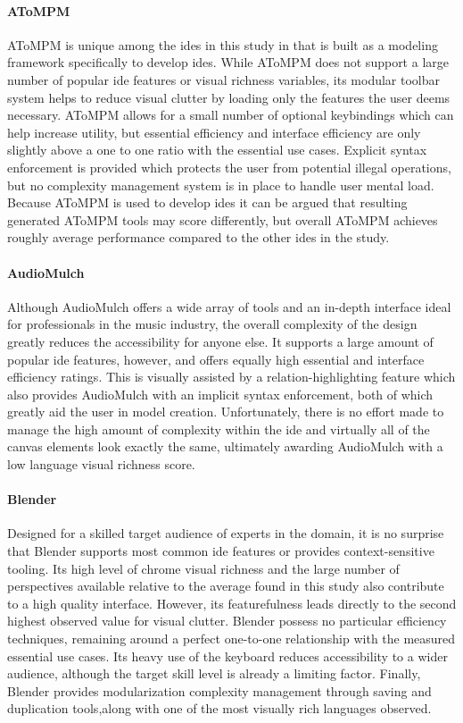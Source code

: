 \paragraph{AToMPM} AToMPM is unique among the \acp{ide} in this study in
that is built as a modeling framework specifically to develop \acp{ide}.
While AToMPM does not support a large number of popular \ac{ide} features
or visual richness variables, its modular toolbar system helps to reduce
visual clutter by loading only the features the user deems necessary.
AToMPM allows for a small number of optional keybindings which can help
increase utility, but essential efficiency and interface efficiency are
only slightly above a one to one ratio with the essential use cases.
Explicit syntax enforcement is provided which protects the user from
potential illegal operations, but no complexity management system is in
place to handle user mental load. Because AToMPM is used to develop
\acp{ide} it can be argued that resulting generated AToMPM tools may score
differently, but overall AToMPM achieves roughly average performance
compared to the other \acp{ide} in the study.

\paragraph{AudioMulch} Although AudioMulch offers a wide array of tools and
an in-depth interface ideal for professionals in the music industry, the
overall complexity of the design greatly reduces the accessibility for
anyone else. It supports a large amount of popular \ac{ide} features,
however, and offers equally high essential and interface efficiency
ratings. This is visually assisted by a relation-highlighting feature which
also provides AudioMulch with an implicit syntax enforcement, both of which
greatly aid the user in model creation. Unfortunately, there is no effort
made to manage the high amount of complexity within the \ac{ide} and
virtually all of the canvas elements look exactly the same, ultimately
awarding AudioMulch with a low language visual richness score.

\paragraph{Blender} Designed for a skilled target audience of experts in
the domain, it is no surprise that Blender supports most common \ac{ide}
features or provides context-sensitive tooling. Its high level of chrome
visual richness and the large number of perspectives available relative to
the average found in this study also contribute to a high quality
interface. However, its featurefulness leads directly to the second highest
observed value for visual clutter. Blender possess no particular efficiency
techniques, remaining around a perfect one-to-one relationship with the
measured essential use cases. Its heavy use of the keyboard reduces
accessibility to a wider audience, although the target skill level is
already a limiting factor. Finally, Blender provides modularization
complexity management through saving and duplication tools,along with one
of the most visually rich languages observed.

